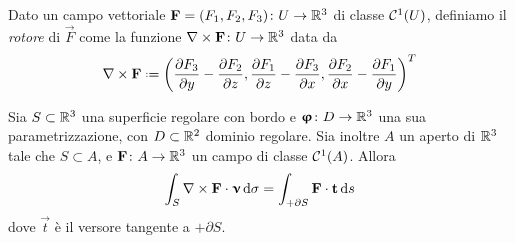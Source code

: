 Dato un campo vettoriale $\mathbf{F}=(F_1,F_2,F_3)\colon U\to\mathbb{R}^3$ di classe $\mathcal{C}^{{1}}(U)$, definiamo il \emph{rotore} di $\vec F$ come la funzione $\nabla\times\mathbf{F}\colon U\to\mathbb{R}^3$ data da
\begin{equation}
	\rot\vec F\defeq\bigg(
		\drp{F_3}{y}-\drp{F_2}{z},
		\drp{F_1}{z}-\drp{F_3}{x},
		\drp{F_2}{x}-\drp{F_1}{y}
		\bigg)^T
\end{equation}
\begin{teorema} \label{t:rotore-R3}
	Sia $S\subset\mathbb{R}^3$ una superficie regolare con bordo e $\bm{\upvarphi}\colon D\to\mathbb{R}^3$ una sua parametrizzazione, con $D\subset\mathbb{R}^2$ dominio regolare.
	Sia inoltre $A$ un aperto di $\mathbb{R}^3$ tale che $S\subset A$, e $\mathbf{F}\colon A\to\mathbb{R}^3$ un campo di classe $\mathcal{C}^{{1}}(A)$.
	Allora
	\begin{equation}
		\int_S{\nabla\times\mathbf{F}}\cdot{\bm{\upnu}}\,\textup{d}\sigma=\int_{+\partial S}{\mathbf{F}}\cdot{\mathbf{t}}\,\textup{d} s
		\label{eq:rotore-R3}
	\end{equation}
	dove $\vec t$ è il versore tangente a $+\partial S$.
\end{teorema}
